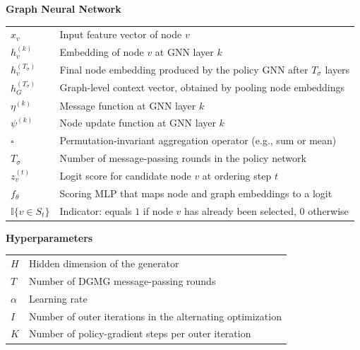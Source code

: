 \documentclass[12pt,a4paper,oneside]{report}
\begin{document}
\noindent\textbf{Graph Neural Network}
\begin{longtable}{p{3.8cm}p{10.2cm}}
$x_v$                      & Input feature vector of node $v$ \\
$h_v^{(k)}$                & Embedding of node $v$ at GNN layer $k$ \\
$h_v^{(T_\sigma)}$         & Final node embedding produced by the policy GNN after $T_\sigma$ layers \\
$h_G^{(T_\sigma)}$         & Graph-level context vector, obtained by pooling node embeddings \\
$\eta^{(k)}$               & Message function at GNN layer $k$ \\
$\psi^{(k)}$               & Node update function at GNN layer $k$ \\
$\square$                  & Permutation-invariant aggregation operator (e.g., sum or mean) \\
$T_\sigma$                 & Number of message-passing rounds in the policy network \\
$z_v^{(t)}$                & Logit score for candidate node $v$ at ordering step $t$ \\
$f_\theta$                 & Scoring MLP that maps node and graph embeddings to a logit \\
$\mathbb{I}\{v\in S_t\}$   & Indicator: equals $1$ if node $v$ has already been selected, $0$ otherwise \\
\end{longtable}

\noindent\textbf{Hyperparameters}
\begin{longtable}{p{3.8cm}p{10.2cm}}
$H$                        & Hidden dimension of the generator \\
$T$                        & Number of DGMG message-passing rounds \\
$\alpha$                   & Learning rate \\
$I$                        & Number of outer iterations in the alternating optimization \\
$K$                        & Number of policy-gradient steps per outer iteration \\
\end{longtable}

\clearpage














\end{document}
